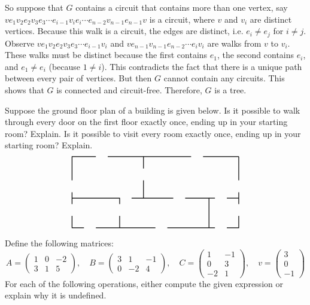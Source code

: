 \documentclass[11pt,letterpaper]{article}
\begin{document}
So suppose that $G$ contains a circuit that contains more than one vertex, say $v e_1 v_2 e_2 v_3 e_3 \cdots e_{i-1} \allowbreak v_i e_i \cdots e_{n-2} v_{n-1} e_{n-1} v$ is a circuit, where $v$ and $v_i$ are distinct vertices. Because this walk is a circuit, the edges are distinct, i.e. $e_i \neq e_j$ for $i \neq j$. Observe $v e_1 v_2 e_2 v_3 e_3 \cdots e_{i-1} v_i$ and $v e_{n-1} v_{n-1} e_{n-2} \cdots e_i v_i$ are walks from $v$ to $v_i$. These walks must be distinct because the first contains $e_1$, the second contains $e_i$, and $e_1 \neq e_i$ (because $1 \neq i$). This contradicts the fact that there is a unique path between every pair of vertices. But then $G$ cannot contain any circuits. This shows that $G$ is connected and circuit-free. Therefore, $G$ is a tree. 



\newpage



 Suppose the ground floor plan of a building is given below. Is it possible to walk through every door on the first floor exactly once, ending up in your starting room? Explain. Is it possible to visit every room exactly once, ending up in your starting room? Explain. \pspace 
	\[
	\graphSix
	\] \pspace






















\newpage



 Define the following matrices:
	\[
	A= \begin{pmatrix} 1 & 0 & -2 \\ 3 & 1 & 5 \end{pmatrix}, \quad
	B= \begin{pmatrix} 3 & 1 & -1 \\	0 & -2 & 4 \end{pmatrix}, \quad
	C= \begin{pmatrix} 1 & -1 \\ 0 & 3 \\ -2 & 1 \end{pmatrix}, \quad
	v= \begin{pmatrix} 3 \\ 0 \\-1\end{pmatrix}
	\]
For each of the following operations, either compute the given expression or explain why it is undefined. 
\end{document}
